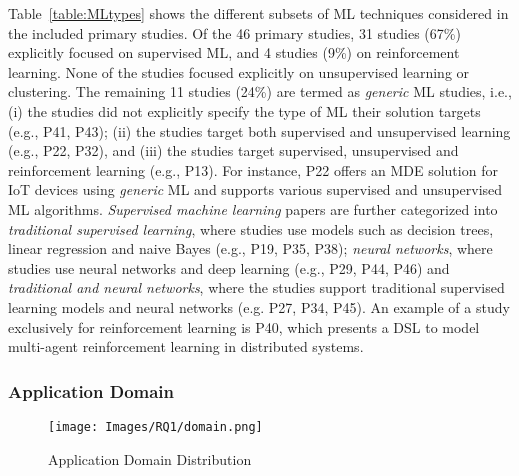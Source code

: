 Table~\ref{table:MLtypes} shows the different subsets of ML techniques considered in the included primary studies. Of the 46 primary studies, 31 studies (67\%) explicitly focused on supervised ML, and 4 studies (9\%) on reinforcement learning. None of the studies focused explicitly on unsupervised learning or clustering. The remaining 11 studies (24\%) are termed as \emph{generic} ML studies, i.e., (i) the studies did not explicitly specify the type of ML their solution targets (e.g., P41, P43); (ii) the studies target both supervised and unsupervised learning (e.g., P22, P32), and (iii) the studies target supervised, unsupervised and reinforcement learning (e.g., P13). For instance, P22 offers an MDE solution for IoT devices using \emph{generic} ML and supports various supervised and unsupervised ML algorithms. \textit{Supervised machine learning} papers are further categorized into \textit{traditional supervised learning}, where studies use models such as decision trees, linear regression and naive Bayes (e.g., P19, P35, P38); \textit{neural networks}, where studies use neural networks and deep learning (e.g., P29, P44, P46) and \textit{traditional and neural networks}, where the studies support traditional supervised learning models and neural networks (e.g. P27, P34, P45). An example of a study exclusively for reinforcement learning is P40, which presents a DSL to model multi-agent reinforcement learning in distributed systems. %


\subsubsection{Application Domain}
\begin{figure}[htbp]
    \centering

    \centering
    \texttt{[image: Images/RQ1/domain.png]}
    \caption{Application Domain Distribution}
    \label{fig:domain}
\end{figure}

